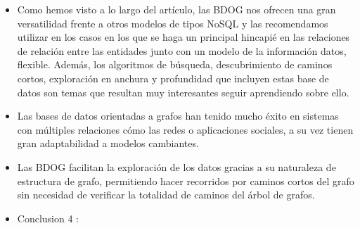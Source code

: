 \documentclass[preprint,12pt]{elsarticle}
\begin{document}
\begin{itemize}

\item Como hemos visto a lo largo del artículo, las BDOG nos ofrecen una gran versatilidad frente a otros modelos de tipos NoSQL y las recomendamos utilizar en los casos en los que se haga un principal hincapié en las relaciones de relación entre las entidades junto con un modelo de la información datos, flexible. Además, los algoritmos de búsqueda, descubrimiento de caminos cortos, exploración en anchura y profundidad que incluyen estas base de datos son temas que resultan muy interesantes seguir aprendiendo sobre ello.\\

\item Las bases de datos orientadas a grafos han tenido mucho éxito en sistemas con múltiples relaciones cómo las redes o aplicaciones sociales, a su vez tienen gran adaptabilidad a modelos cambiantes. \\ 

\item Las BDOG facilitan la exploración de los datos gracias a su naturaleza de estructura de grafo, permitiendo hacer recorridos por caminos cortos del grafo sin necesidad de verificar la totalidad de caminos del árbol de grafos. \\ 

\item Conclusion 4 : \\ 
\end{itemize}


	
	\newpage


		 
	


	
\end{document}
